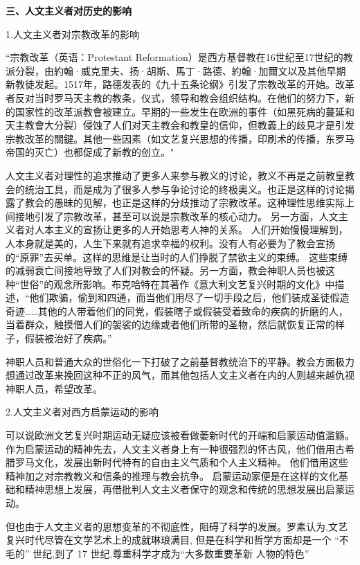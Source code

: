 \documentclass[UTF8]{ctexart}
\begin{document}
    \textbf{三、人文主义者对历史的影响}\par
    1.人文主义者对宗教改革的影响\par
    “宗教改革（英语：Protestant Reformation）是西方基督教在16世纪至17世纪的教派分裂，由約翰·威克里夫、扬·胡斯、馬丁·路德、約翰·加爾文以及其他早期新教徒发起。1517年，路德发表的《九十五条论纲》引发了宗教改革的开始。改革者反对当时罗马天主教的教条，仪式，领导和教会组织结构。在他们的努力下，新的国家性的改革派教會被建立。早期的一些发生在欧洲的事件（如黑死病的蔓延和天主教會大分裂）侵蚀了人们对天主教会和教皇的信仰，但教義上的歧見才是引发宗教改革的關鍵。其他一些因素（如文艺复兴思想的传播，印刷术的传播，东罗马帝国的灭亡）也都促成了新教的创立。"\footnotemark[8]\par
    人文主义者对理性的追求推动了更多人来参与教义的讨论，教义不再是之前教皇教会的统治工具，而是成为了很多人参与争论讨论的终极奥义。也正是这样的讨论揭露了教会的愚昧的见解，也正是这样的分歧推动了宗教改革。这种理性思维实际上间接地引发了宗教改革，甚至可以说是宗教改革的核心动力。
    另一方面，人文主义者对人本主义的宣扬让更多的人开始思考人神的关系。
    人们开始慢慢理解到，人本身就是美的，人生下来就有追求幸福的权利。没有人有必要为了教会宣扬的“原罪”去买单。这样的思维是让当时的人们挣脱了禁欲主义的束缚。
    这些束缚的减弱衰亡间接地导致了人们对教会的怀疑。另一方面，教会神职人员也被这种“世俗”的观念所影响。布克哈特在其著作《意大利文艺复兴时期的文化》中描述，“他们欺骗，偷到和四通，而当他们用尽了一切手段之后，他们装成圣徒假造奇迹……其他的人带着他们的同党，假装瞎子或假装受着致命的疾病的折磨的人，当着群众，触摸僧人们的袈裟的边缘或者他们所带的圣物，然后就恢复正常的样子，假装被治好了疾病。”\footnotemark[9]\par
    神职人员和普通大众的世俗化一下打破了之前基督教统治下的平静。教会方面极力想通过改革来挽回这种不正的风气，而其他包括人文主义者在内的人则越来越仇视神职人员，希望改革。\par
    2.人文主义者对西方启蒙运动的影响\par
    可以说欧洲文艺复兴时期运动无疑应该被看做萎新时代的开端和启蒙运动值滥觞。作为启蒙运动的精神先去，人文主义者身上有一种很强烈的怀古风，他们借用古希腊罗马文化，发展出新时代特有的自由主义气质和个人主义精神。
    他们借用这些精神加之对宗教教义和信条的推理与教会抗争。
    启蒙运动家便是在这样的文化基础和精神思想上发展，再借批判人文主义者保守的观念和传统的思想发展出启蒙运动。\par
    但也由于人文主义者的思想变革的不彻底性，阻碍了科学的发展。罗素认为,文艺复兴时代尽管在文学艺术上的成就琳琅满目, 但是在科学和哲学方面却是一个 “不毛的” 世纪,到了 17 世纪,尊重科学才成为“大多数重要革新 人物的特色”\footnotemark[10]
    
\end{document}

